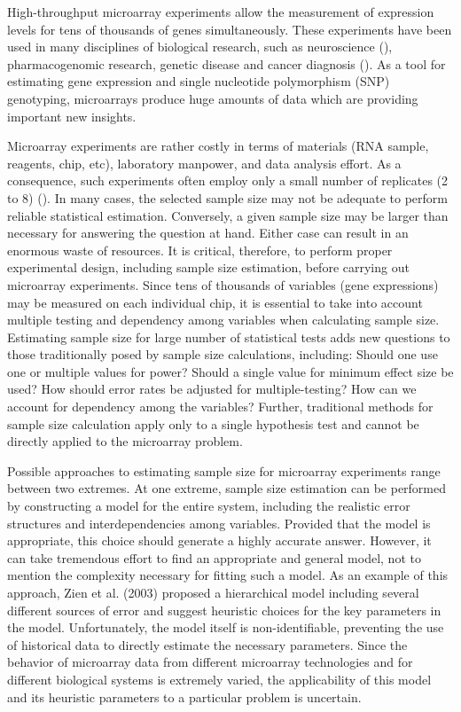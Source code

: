 \documentclass{bioinfo}
\begin{document}
High-throughput microarray experiments allow the measurement of
expression levels for tens of thousands of genes simultaneously.
These experiments have been used in many disciplines of biological
research, such as neuroscience (\citealp{Mandel03}), pharmacogenomic
research, genetic disease and cancer diagnosis (\citealp{Heller02}).
As a tool for estimating gene expression and single nucleotide
polymorphism (SNP) genotyping, microarrays produce huge amounts of
data which are providing important new insights.

Microarray experiments are rather costly in terms of materials (RNA
sample, reagents, chip, etc), laboratory manpower, and data analysis
effort.  As a consequence, such experiments often employ only
a small number of replicates (2 to 8) (\citealp{Speed03}). In many
cases, the selected sample size may not be adequate to perform
reliable statistical estimation.  Conversely, a given sample size
may be larger than necessary for answering the question at hand.
Either case can result in an enormous waste of resources. It is
critical, therefore, to perform proper experimental design,
including sample size estimation, before carrying out microarray
experiments. Since tens of thousands of variables (gene expressions)
may be measured on each individual chip, it is essential to take into
account multiple testing and dependency among variables when
calculating sample size.  Estimating sample size for large number of
statistical tests adds new questions to those traditionally posed by
sample size calculations, including: Should one use one or multiple
values for power? Should a single value for minimum effect size be
used?  How should error rates be adjusted for multiple-testing?  How
can we account for dependency among the variables?  Further,
traditional methods for sample size calculation apply only to a
single hypothesis test and cannot be directly applied to the
microarray problem.

Possible approaches to estimating sample size for microarray
experiments range between two extremes. At one extreme, sample size
estimation can be performed by constructing a model for the entire
system, including the realistic error structures and
interdependencies among variables. Provided that the model is
appropriate, this choice should generate a highly accurate answer.
However, it can take tremendous effort to find an appropriate and
general model, not to mention the complexity necessary for fitting
such a model. As an example of this approach, Zien et al. (2003)
proposed a hierarchical model including several different sources of
error and suggest heuristic choices for the key parameters in the
model. Unfortunately, the model itself is non-identifiable,
preventing the use of historical data to directly estimate
the necessary parameters.  Since the behavior of microarray data from
different microarray technologies and for different biological
systems is extremely varied, the applicability of this model and its
heuristic parameters to a particular problem is uncertain.
\end{document}
